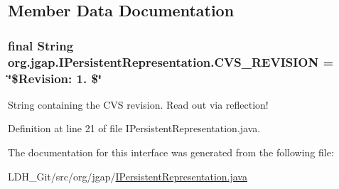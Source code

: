 \subsection{Member Data Documentation}
\hypertarget{interfaceorg_1_1jgap_1_1_i_persistent_representation_ae48c5895f4af079337ffebe487b176f5}{
\subsubsection[{C\-V\-S\-\_\-\-R\-E\-V\-I\-S\-I\-O\-N}]{\setlength{\rightskip}{0pt plus 5cm}final String org.\-jgap.\-I\-Persistent\-Representation.\-C\-V\-S\-\_\-\-R\-E\-V\-I\-S\-I\-O\-N = \char`\"{}\$Revision\-: 1. \$\char`\"{}\hspace{0.3cm}{\ttfamily [static]}}}\label{interfaceorg_1_1jgap_1_1_i_persistent_representation_ae48c5895f4af079337ffebe487b176f5}
String containing the C\-V\-S revision. Read out via reflection! 

Definition at line 21 of file I\-Persistent\-Representation.\-java.



The documentation for this interface was generated from the following file\-:\begin{DoxyCompactItemize}
\item 
L\-D\-H\-\_\-\-Git/src/org/jgap/\hyperlink{_i_persistent_representation_8java}{I\-Persistent\-Representation.\-java}\end{DoxyCompactItemize}
